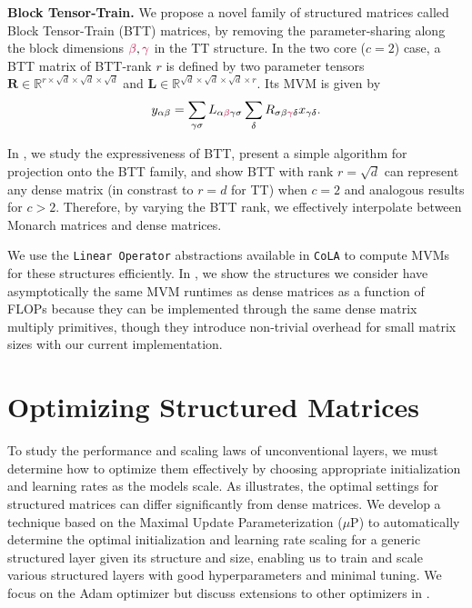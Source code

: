 \documentclass{article}
\newcommand{\mbf}[1]{{\boldsymbol{\mathbf{#1}}}}
\newcommand{\bm}{\mbf}
\theoremstyle{plain}
\theoremstyle{definition}
\theoremstyle{remark}
\newcommand{\tc}[1]{\textcolor{purple}{#1}}
\newcommand{\mup}{$\mu$P\xspace}
\newcommand{\R}{\mathbb{R}}
\begin{document}
\noindent \textbf{Block Tensor-Train.} \quad
We propose a novel family of structured matrices called Block Tensor-Train (BTT) matrices, by removing the parameter-sharing along the block dimensions $\tc{\beta},\tc{\gamma}$ in the TT structure. In the two core ($c=2$) case, a BTT matrix of BTT-rank $r$ is defined by two parameter tensors $\bm{R} \in \R^{r \times \sqrt{d} \times \sqrt{d} \times \sqrt{d}}$ and $\bm{L} \in \R^{\sqrt{d} \times \sqrt{d} \times \sqrt{d} \times r}.$ Its MVM is given by
\begin{equation} \label{eq:btt}
    \begin{split}
      y_{\alpha\beta} = \sum_{\gamma\sigma} L_{\alpha\tc{\beta}\gamma\sigma} \sum_{\delta} R_{\sigma\beta\tc{\gamma}\delta} x_{\gamma\delta}.
    \end{split}
\end{equation}

In , we study the expressiveness of BTT, present a simple algorithm for projection onto the BTT family, and show BTT with rank $r=\sqrt{d}$ can represent any dense matrix (in constrast to $r=d$ for TT) when $c=2$ and analogous results for $c > 2$. Therefore, by varying the BTT rank, we effectively interpolate between Monarch matrices and dense matrices.

We use the \texttt{Linear Operator} abstractions available in \texttt{CoLA} \citep{potapczynski2024cola} to compute MVMs for these structures efficiently. In , we show the structures we consider have asymptotically the same MVM runtimes as dense matrices as a function of FLOPs because they can be implemented through the same dense matrix multiply primitives, though they introduce non-trivial overhead for small matrix sizes with our current implementation.

\section{Optimizing Structured Matrices} \label{sec:sucessful}

To study the performance and scaling laws of unconventional layers, we must determine how to optimize them effectively by choosing appropriate initialization and learning rates as the models scale. As  illustrates, the optimal settings for structured matrices can differ significantly from dense matrices. We develop a technique based on the Maximal Update Parameterization (\mup) \citep{yang2021infty, yang2023iv, yang2021v} to automatically determine the optimal initialization and learning rate scaling for a generic structured layer given its structure and size, enabling us to train and scale various structured layers with good hyperparameters and minimal tuning. We focus on the Adam optimizer \citep{kingma2015adam} but discuss extensions to other optimizers in .
\end{document}
